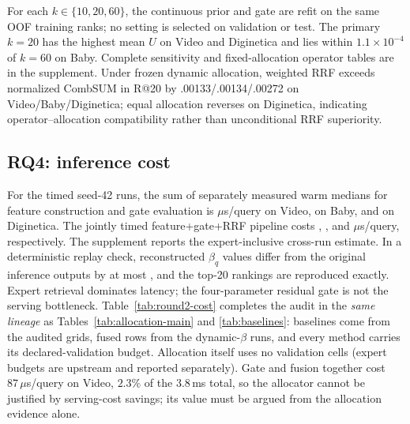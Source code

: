 \documentclass[runningheads]{llncs}
\begin{document}
For each $k\in\{10,20,60\}$, the continuous prior and gate are refit on the
same OOF training ranks; no setting is selected on validation or test. The
primary $k=20$ has the highest mean $U$ on Video and Diginetica and lies
within $1.1\times10^{-4}$ of $k=60$ on Baby. Complete sensitivity and
fixed-allocation operator tables are in the supplement. Under frozen dynamic
allocation, weighted RRF exceeds normalized CombSUM in R@20 by
.00133/.00134/.00272 on Video/Baby/Diginetica; equal allocation reverses on
Diginetica, indicating operator--allocation compatibility rather than
unconditional RRF superiority.

\subsection{RQ4: inference cost}
For the timed seed-42 runs, the sum of separately measured warm medians
for feature construction and gate evaluation is
\DynamicRuntimeVideoGateUs{} $\mu$s/query
on Video, \DynamicRuntimeBabyGateUs{} on Baby, and
\DynamicRuntimeDigiGateUs{} on Diginetica. The jointly timed
feature+gate+RRF pipeline costs \DynamicRuntimeVideoPostUs{},
\DynamicRuntimeBabyPostUs{}, and
\DynamicRuntimeDigiPostUs{} $\mu$s/query, respectively. The supplement reports
the expert-inclusive cross-run estimate.
In a deterministic replay check, reconstructed $\beta_q$ values differ from
the original inference outputs by at most \DynamicRuntimeMaxBetaError{}, and
the top-20 rankings are reproduced exactly. Expert retrieval dominates latency; the
four-parameter residual gate is not the serving bottleneck.
Table~\ref{tab:round2-cost} completes the audit in the \emph{same lineage} as
Tables~\ref{tab:allocation-main} and \ref{tab:baselines}: baselines come from
the audited grids, fused rows from the dynamic-$\beta$ runs, and every method
carries its declared-validation budget. Allocation itself uses no validation
cells (expert budgets are upstream and reported separately). Gate and fusion
together cost $87\,\mu$s/query on Video, $2.3\%$ of the $3.8$\,ms total, so
the allocator cannot be justified by serving-cost savings; its value must be
argued from the allocation evidence alone.

\end{document}
